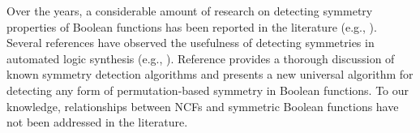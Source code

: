 Over the years, a considerable amount of research on detecting symmetry properties 
of Boolean functions has been reported in the literature
(e.g., \cite{BS-1968,Biswas-1970,TM-1996,KS-2000,Darga-etal-2008,Maurer-2015}).
Several references have observed the usefulness of detecting symmetries
in automated logic synthesis (e.g., \cite{AP-2008,Hu-etal-2008,Darga-etal-2008}).
Reference \cite{Maurer-2015} provides a thorough discussion of known
symmetry detection algorithms and presents a new universal algorithm 
for detecting any form of permutation-based symmetry in Boolean functions. 
To our knowledge, relationships between NCFs and symmetric
Boolean functions have not been addressed in the literature.
